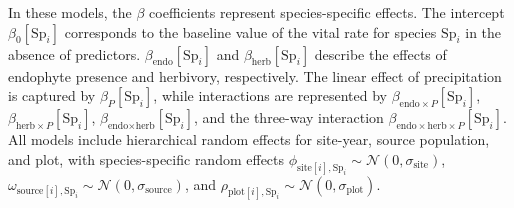 \documentclass[12pt]{article}\usepackage[]{graphicx}\usepackage[dvipsnames]{xcolor}
\begin{document}
In these models, the $\beta$ coefficients represent species-specific effects. 
The intercept $\beta_0[\text{Sp}_i]$ corresponds to the baseline value of the vital rate for species $\text{Sp}_i$ in the absence of predictors. $\beta_{\text{endo}}[\text{Sp}_i]$ and $\beta_{\text{herb}}[\text{Sp}_i]$ describe the effects of endophyte presence and herbivory, respectively. The linear effect of precipitation is captured by $\beta_P[\text{Sp}_i]$, while interactions are represented by $\beta_{\text{endo}\times P}[\text{Sp}_i]$, $\beta_{\text{herb}\times P}[\text{Sp}_i]$, $\beta_{\text{endo}\times \text{herb}}[\text{Sp}_i]$, and the three-way interaction $\beta_{\text{endo}\times \text{herb} \times P}[\text{Sp}_i]$. 
All models include hierarchical random effects for site-year, source population, and plot, with species-specific random effects $\phi_{\text{site}[i],\text{Sp}_i} \sim \mathcal{N}(0, \sigma_{\text{site}})$, $\omega_{\text{source}[i],\text{Sp}_i} \sim \mathcal{N}(0, \sigma_{\text{source}})$, and $\rho_{\text{plot}[i],\text{Sp}_i} \sim \mathcal{N}(0, \sigma_{\text{plot}})$.
\clearpage 
\end{document}
